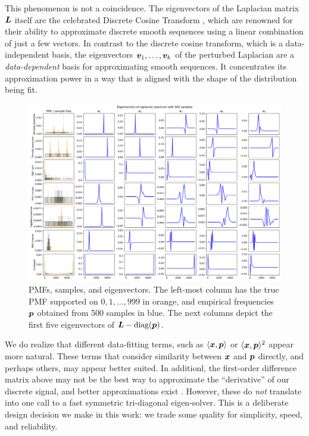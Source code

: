 \documentclass[10pt]{article} %
\DeclareMathOperator{\diag}{diag}
\begin{document}
This phenomenon is not a coincidence. The eigenvectors of the Laplacian matrix ${\bm{L}}$ itself are the celebrated Discrete Cosine Transform \citep{the_dct}, which are renowned for their ability to approximate discrete smooth sequences using a linear combination of just a few vectors. In contrast to the discrete cosine transform, which is a data-independent basis, the eigenvectors ${\bm{v}}_1, \dots, {\bm{v}}_k$ of the perturbed Laplacian are a \emph{data-dependent} basis for approximating smooth sequences. It concentrates its approximation power in a way that is aligned with the shape of the distribution being fit.

\begin{figure}[tbh]
    \centering
    \includegraphics[width=\textwidth]{eigenvectors}
    \caption{PMFs, samples, and eigenvectors. The left-most column has the true PMF supported on $0, 1, \dots, 999$ in orange, and empirical frequencies ${\bm{p}}$ obtained from 500 samples in blue. The next columns depict the first five eigenvectors of $\mL - \diag(\vp)$.}
    \label{fig:eigenvectors}
\end{figure}

We do realize that different data-fitting terms, such as $\langle {\bm{x}}, {\bm{p}} \rangle$ or $\langle {\bm{x}}, {\bm{p}} \rangle^2$ appear more natural. These terms that consider similarity between ${\bm{x}}$ and ${\bm{p}}$ directly, and perhaps others, may appear better suited. In additionl, the first-order difference matrix above may not be the best way to approximate the ``derivative'' of our discrete signal, and better approximations exist \citep{semiclassical}. However, these do \emph{not} translate into one call to a fast symmetric tri-diagonal eigen-solver. This is a deliberate design decision we make in this work: we trade some quality for simplicity, speed, and reliability.
\end{document}
